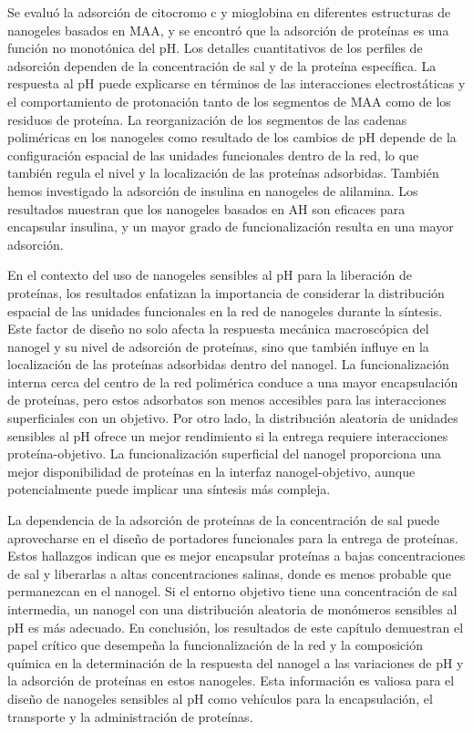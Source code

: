 Se evalu\'o la adsorci\'on de citocromo c y mioglobina en diferentes estructuras de nanogeles basados en MAA, y se encontr\'o que la adsorci\'on de prote\'inas es una funci\'on no monot\'onica del pH.
Los detalles cuantitativos de los perfiles de adsorci\'on dependen de la concentraci\'on de sal y de la prote\'ina espec\'ifica.
La respuesta al pH puede explicarse en t\'erminos de las interacciones electrost\'aticas y el comportamiento de protonaci\'on tanto de los segmentos de MAA como de los residuos de prote\'ina.
La reorganizaci\'on de los segmentos de las cadenas polim\'ericas en los nanogeles como resultado de los cambios de pH depende de la configuraci\'on espacial de las unidades funcionales dentro de la red, lo que tambi\'en regula el nivel y la localizaci\'on de las prote\'inas adsorbidas.
Tambi\'en hemos investigado la adsorci\'on de insulina en nanogeles de alilamina.
Los  resultados muestran que los nanogeles basados en AH son eficaces para encapsular insulina, y un mayor grado de funcionalizaci\'on resulta en una mayor adsorci\'on.

En el contexto del uso de nanogeles sensibles al pH para la liberaci\'on de prote\'inas, los resultados enfatizan la importancia de considerar la distribuci\'on espacial de las unidades funcionales en la red de nanogeles durante la s\'intesis.
Este factor de dise\~no no solo afecta la respuesta mec\'anica macrosc\'opica del nanogel y su nivel de adsorci\'on de prote\'inas, sino que tambi\'en influye en la localizaci\'on de las prote\'inas adsorbidas dentro del nanogel.
La funcionalizaci\'on interna cerca del centro de la red polim\'erica conduce a una mayor encapsulaci\'on de prote\'inas, pero estos adsorbatos son menos accesibles para las interacciones superficiales con un objetivo.
Por otro lado, la distribuci\'on aleatoria de unidades sensibles al pH ofrece un mejor rendimiento si la entrega requiere interacciones prote\'ina-objetivo.
La funcionalizaci\'on superficial del nanogel proporciona una mejor disponibilidad de prote\'inas en la interfaz nanogel-objetivo, aunque potencialmente puede implicar una s\'intesis m\'as compleja.

La dependencia de la adsorci\'on de prote\'inas de la concentraci\'on de sal puede aprovecharse en el dise\~no de portadores funcionales para la entrega de prote\'inas.
Estos hallazgos indican que es mejor encapsular prote\'inas a bajas concentraciones de sal y liberarlas a altas concentraciones salinas, donde es menos probable que permanezcan en el nanogel.
Si el entorno objetivo tiene una concentraci\'on de sal intermedia, un nanogel con una distribuci\'on aleatoria de mon\'omeros sensibles al pH es m\'as adecuado.
En conclusi\'on, los resultados de este cap\'itulo demuestran el papel cr\'itico que desempe\~na la funcionalizaci\'on de la red y la composici\'on qu\'imica en la determinaci\'on de la respuesta del nanogel a las variaciones de pH y la adsorci\'on de prote\'inas en estos nanogeles.
Esta informaci\'on es valiosa para el dise\~no de nanogeles sensibles al pH como veh\'iculos para la encapsulaci\'on, el transporte y la administraci\'on de prote\'inas.

